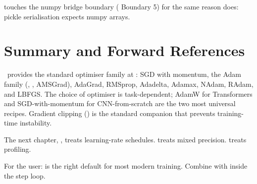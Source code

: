  touches the numpy bridge boundary
( Boundary 5) for the same reason
 does: pickle serialisation expects
numpy arrays.

\section{Summary and Forward References}
\label{sec:optimizers:summary}

\Lucid\ provides the standard optimiser family at
: SGD with momentum, the Adam family
(, , AMSGrad), AdaGrad, RMSprop, Adadelta,
Adamax, NAdam, RAdam, and LBFGS. The choice of optimiser is
task-dependent; AdamW for Transformers and SGD-with-momentum for
CNN-from-scratch are the two most universal recipes. Gradient
clipping () is the standard
companion that prevents training-time instability.

The next chapter, , treats learning-rate
schedules.  treats mixed precision.
 treats profiling.

\begin{lucidnote}
For the user:  is the right default for most modern
training. Combine with 
inside the step loop.
\end{lucidnote}
